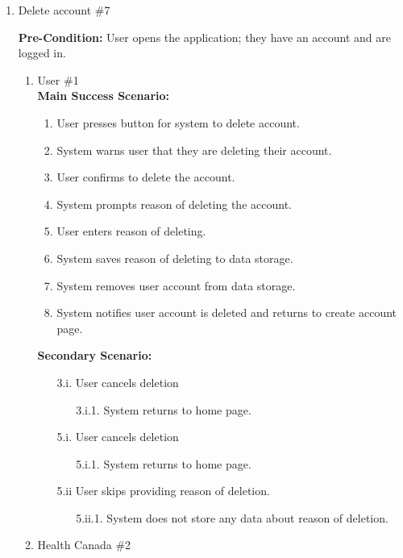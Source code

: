 \documentclass[]{article}
\begin{document}
\begin{enumerate}[{\bf BE1.}]
	\item Delete account \#7
	
	\textbf{Pre-Condition:} User opens the application; they have an account and are logged in.
		\begin{enumerate}[{\bf VP1.}]
			\item User \#1 \\
				\textbf{Main Success Scenario:} 
				\begin{enumerate}[{1.}]
					\item User presses button for system to delete account.
					\item System warns user that they are deleting their account.
					\item User confirms to delete the account.
					\item System prompts reason of deleting the account.
					\item User enters reason of deleting.
					\item System saves reason of deleting to data storage.
					\item System removes user account from data storage.
					\item System notifies user account is deleted and returns to create account page.
				\end{enumerate}
				\textbf{Secondary Scenario:}
				\begin{enumerate}
					\item[3.i.] User cancels deletion
					\begin{enumerate}
						\item[3.i.1.] System returns to home page. 
					\end{enumerate}
				\end{enumerate}
				\begin{enumerate}
					\item[5.i.] User cancels deletion
					\begin{enumerate}
						\item[5.i.1.] System returns to home page. 
					\end{enumerate}
					\item [5.ii] User skips providing reason of deletion.
					\begin{enumerate}
						\item[5.ii.1.] System does not store any data about reason of deletion.
					\end{enumerate}
				\end{enumerate}
			\item Health Canada  \#2 \\

\end{enumerate}
\end{enumerate}
\end{document}
